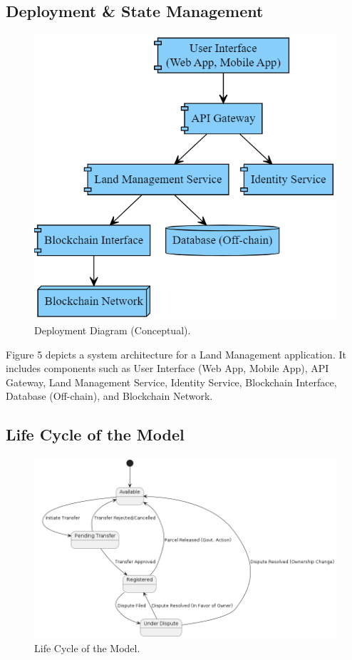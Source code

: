 \documentclass[conference]{IEEEtran}
\begin{document}
\subsection{Deployment \& State Management}
    \begin{figure}[H]
        \centerline{\includegraphics[width=0.9\linewidth]{fig6.png}}
        \caption{Deployment Diagram (Conceptual).}
        \label{fig6}
    \end{figure}
    Figure 5 depicts a system architecture for a Land Management application. It includes components such as User Interface (Web App, Mobile App), API Gateway, Land Management Service, Identity Service, Blockchain Interface, Database (Off-chain), and Blockchain Network.

\subsection{Life Cycle of the Model}
    \begin{figure}[H]
        \centerline{\includegraphics[width=\linewidth]{fig7.png}}
        \caption{Life Cycle of the Model.}
        \label{fig7}
    \end{figure}
\end{document}
